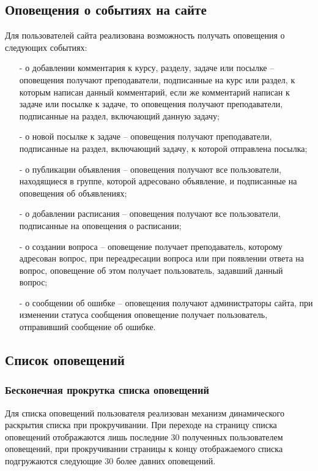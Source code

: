 \documentclass[12pt, a4paper, oneside]{article}
\begin{document}
\subsection{Оповещения о событиях на сайте}
Для пользователей сайта реализована возможность получать оповещения о следующих событиях:
\begin{itemize}
    \item [-] о добавлении комментария к курсу, разделу, задаче или посылке – оповещения получают преподаватели, подписанные на курс или раздел, к которым написан данный комментарий, если же комментарий написан к задаче или посылке к задаче, то оповещения получают преподаватели, подписанные на раздел, включающий данную задачу;
    \item [-] о новой посылке к задаче – оповещения получают преподаватели, подписанные на раздел, включающий задачу, к которой отправлена посылка;
    \item [-] о публикации объявления – оповещения получают все пользователи, находящиеся в группе, которой адресовано объявление, и подписанные на оповещения об объявлениях;
    \item [-] о добавлении расписания – оповещения получают все пользователи, подписанные на оповещения о расписании;
    \item [-] о создании вопроса – оповещение получает преподаватель, которому адресован вопрос, при переадресации вопроса или при появлении ответа на вопрос, оповещение об этом получает пользователь, задавший данный вопрос;
    \item [-] о сообщении об ошибке – оповещения получают администраторы сайта, при изменении статуса сообщения оповещение получает пользователь, отправивший сообщение об ошибке.
\end{itemize}
\subsection{Список оповещений}
\subsubsection{Бесконечная прокрутка списка оповещений}
Для списка оповещений пользователя реализован механизм динамического раскрытия списка при прокручивании. При переходе на страницу списка оповещений отображаются лишь последние 30 полученных пользователем оповещений, при прокручивании страницы к концу отображаемого списка подгружаются следующие 30 более давних оповещений.
\end{document}

